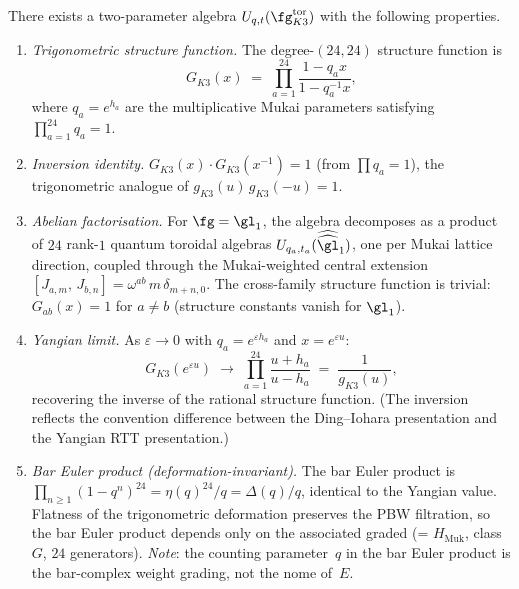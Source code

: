 \begin{conjecture}
\label{conj:k3-quantum-toroidal}
\ClaimStatusConjectured
There exists a two-parameter algebra
$U_{q,t}(\fg_{K3}^{\mathrm{tor}})$ with the following properties.
\begin{enumerate}[label=\textup{(\roman*)}]
\item \emph{Trigonometric structure function.}
The degree-$(24,24)$ structure function is
\begin{equation}\label{eq:k3-qt-structure-fn}
  G_{K3}(x) \;=\; \prod_{a=1}^{24}
  \frac{1 - q_a x}{1 - q_a^{-1} x},
\end{equation}
where $q_a = e^{h_a}$ are the multiplicative Mukai parameters
satisfying $\prod_{a=1}^{24} q_a = 1$.

\item \emph{Inversion identity.}
$G_{K3}(x) \cdot G_{K3}(x^{-1}) = 1$ (from $\prod q_a = 1$),
the trigonometric analogue of $g_{K3}(u)\, g_{K3}(-u) = 1$.

\item \emph{Abelian factorisation.}
For $\fg = \gl_1$, the algebra decomposes as a product of $24$
rank-$1$ quantum toroidal algebras
$U_{q_a, t_a}(\widehat{\widehat{\gl}}_1)$, one per Mukai lattice
direction, coupled through the Mukai-weighted central extension
$[J_{a,m},\, J_{b,n}] = \omega^{ab}\, m\, \delta_{m+n,0}$.
The cross-family structure function is trivial:
$G_{ab}(x) = 1$ for $a \neq b$ (structure constants vanish for $\gl_1$).

\item \emph{Yangian limit.}
As $\varepsilon \to 0$ with $q_a = e^{\varepsilon h_a}$
and $x = e^{\varepsilon u}$:
\[
  G_{K3}(e^{\varepsilon u})
  \;\longrightarrow\;
  \prod_{a=1}^{24} \frac{u + h_a}{u - h_a}
  \;=\; \frac{1}{g_{K3}(u)},
\]
recovering the inverse of the rational structure function.
(The inversion reflects the convention difference between
the Ding--Iohara presentation and the Yangian RTT presentation.)

\item \emph{Bar Euler product (deformation-invariant).}
The bar Euler product is $\prod_{n \geq 1}(1-q^n)^{24}
= \eta(q)^{24}/q = \Delta(q)/q$, identical to the Yangian value.
Flatness of the trigonometric deformation preserves the PBW
filtration, so the bar Euler product depends only on the
associated graded (= $H_{\mathrm{Muk}}$, class~$G$, $24$ generators).
\emph{Note}: the counting parameter~$q$ in the bar Euler product is the
bar-complex weight grading, not the nome of~$E$.


\end{enumerate}
\end{conjecture}
